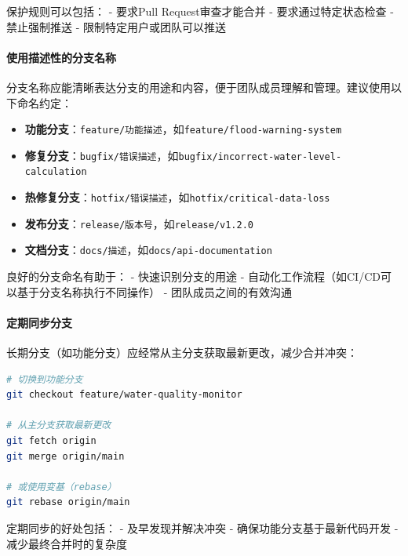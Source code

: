 保护规则可以包括： - 要求Pull Request审查才能合并 - 要求通过特定状态检查
- 禁止强制推送 - 限制特定用户或团队可以推送

\paragraph{使用描述性的分支名称}\label{ux4f7fux7528ux63cfux8ff0ux6027ux7684ux5206ux652fux540dux79f0}

分支名称应能清晰表达分支的用途和内容，便于团队成员理解和管理。建议使用以下命名约定：

\begin{itemize}
\tightlist
\item
  \textbf{功能分支}：\passthrough{\lstinline!feature/功能描述!}，如\passthrough{\lstinline!feature/flood-warning-system!}
\item
  \textbf{修复分支}：\passthrough{\lstinline!bugfix/错误描述!}，如\passthrough{\lstinline!bugfix/incorrect-water-level-calculation!}
\item
  \textbf{热修复分支}：\passthrough{\lstinline!hotfix/错误描述!}，如\passthrough{\lstinline!hotfix/critical-data-loss!}
\item
  \textbf{发布分支}：\passthrough{\lstinline!release/版本号!}，如\passthrough{\lstinline!release/v1.2.0!}
\item
  \textbf{文档分支}：\passthrough{\lstinline!docs/描述!}，如\passthrough{\lstinline!docs/api-documentation!}
\end{itemize}

良好的分支命名有助于： - 快速识别分支的用途 -
自动化工作流程（如CI/CD可以基于分支名称执行不同操作） -
团队成员之间的有效沟通

\paragraph{定期同步分支}\label{ux5b9aux671fux540cux6b65ux5206ux652f}

长期分支（如功能分支）应经常从主分支获取最新更改，减少合并冲突：

\begin{lstlisting}[language=bash]
# 切换到功能分支
git checkout feature/water-quality-monitor

# 从主分支获取最新更改
git fetch origin
git merge origin/main

# 或使用变基（rebase）
git rebase origin/main
\end{lstlisting}

定期同步的好处包括： - 及早发现并解决冲突 - 确保功能分支基于最新代码开发
- 减少最终合并时的复杂度

